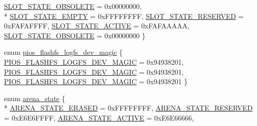 \begin{DoxyCompactItemize}
\hyperlink{group___p_i_o_s___f_l_a_s_h_f_s_gga7df58e5fca7cec32767a0481da453e74aff81f83249791cda333bde0850150ccc}{S\-L\-O\-T\-\_\-\-S\-T\-A\-T\-E\-\_\-\-O\-B\-S\-O\-L\-E\-T\-E} = 0x00000000, 
\\*
\hyperlink{group___p_i_o_s___f_l_a_s_h_f_s_gga7df58e5fca7cec32767a0481da453e74a3ec4030cfe6de3e15e9ce08f12c91734}{S\-L\-O\-T\-\_\-\-S\-T\-A\-T\-E\-\_\-\-E\-M\-P\-T\-Y} = 0x\-F\-F\-F\-F\-F\-F\-F\-F, 
\hyperlink{group___p_i_o_s___f_l_a_s_h_f_s_gga7df58e5fca7cec32767a0481da453e74acf379d22c045f40511eab34f8aafba5e}{S\-L\-O\-T\-\_\-\-S\-T\-A\-T\-E\-\_\-\-R\-E\-S\-E\-R\-V\-E\-D} = 0x\-F\-A\-F\-A\-F\-F\-F\-F, 
\hyperlink{group___p_i_o_s___f_l_a_s_h_f_s_gga7df58e5fca7cec32767a0481da453e74acf5fd7f439ede2b21808a3edc1acc4f4}{S\-L\-O\-T\-\_\-\-S\-T\-A\-T\-E\-\_\-\-A\-C\-T\-I\-V\-E} = 0x\-F\-A\-F\-A\-A\-A\-A\-A, 
\hyperlink{group___p_i_o_s___f_l_a_s_h_f_s_gga7df58e5fca7cec32767a0481da453e74aff81f83249791cda333bde0850150ccc}{S\-L\-O\-T\-\_\-\-S\-T\-A\-T\-E\-\_\-\-O\-B\-S\-O\-L\-E\-T\-E} = 0x00000000
 \}
\item 
enum \hyperlink{group___p_i_o_s___f_l_a_s_h_f_s_ga27472bb2a0fbfb6302378ef138c6a41f}{pios\-\_\-flashfs\-\_\-logfs\-\_\-dev\-\_\-magic} \{ \hyperlink{group___p_i_o_s___f_l_a_s_h_f_s_gga27472bb2a0fbfb6302378ef138c6a41fa48f1badb0700a4f00d8da2af591f701b}{P\-I\-O\-S\-\_\-\-F\-L\-A\-S\-H\-F\-S\-\_\-\-L\-O\-G\-F\-S\-\_\-\-D\-E\-V\-\_\-\-M\-A\-G\-I\-C} = 0x94938201, 
\hyperlink{group___p_i_o_s___f_l_a_s_h_f_s_gga27472bb2a0fbfb6302378ef138c6a41fa48f1badb0700a4f00d8da2af591f701b}{P\-I\-O\-S\-\_\-\-F\-L\-A\-S\-H\-F\-S\-\_\-\-L\-O\-G\-F\-S\-\_\-\-D\-E\-V\-\_\-\-M\-A\-G\-I\-C} = 0x94938201, 
\hyperlink{group___p_i_o_s___f_l_a_s_h_f_s_gga27472bb2a0fbfb6302378ef138c6a41fa48f1badb0700a4f00d8da2af591f701b}{P\-I\-O\-S\-\_\-\-F\-L\-A\-S\-H\-F\-S\-\_\-\-L\-O\-G\-F\-S\-\_\-\-D\-E\-V\-\_\-\-M\-A\-G\-I\-C} = 0x94938201
 \}
\item 
enum \hyperlink{group___p_i_o_s___f_l_a_s_h_f_s_gaa936149cfd5559190d20879c10e0fcee}{arena\-\_\-state} \{ \\*
\hyperlink{group___p_i_o_s___f_l_a_s_h_f_s_ggaa936149cfd5559190d20879c10e0fceea0868f5f69dae5f489f86f324fb2ec026}{A\-R\-E\-N\-A\-\_\-\-S\-T\-A\-T\-E\-\_\-\-E\-R\-A\-S\-E\-D} = 0x\-F\-F\-F\-F\-F\-F\-F\-F, 
\hyperlink{group___p_i_o_s___f_l_a_s_h_f_s_ggaa936149cfd5559190d20879c10e0fceeac20424e4b3a3a918490e8c307996fe7c}{A\-R\-E\-N\-A\-\_\-\-S\-T\-A\-T\-E\-\_\-\-R\-E\-S\-E\-R\-V\-E\-D} = 0x\-E6\-E6\-F\-F\-F\-F, 
\hyperlink{group___p_i_o_s___f_l_a_s_h_f_s_ggaa936149cfd5559190d20879c10e0fceea8bac821a323307ac4aa7b2de12f4896b}{A\-R\-E\-N\-A\-\_\-\-S\-T\-A\-T\-E\-\_\-\-A\-C\-T\-I\-V\-E} = 0x\-E6\-E66666, 

\end{DoxyCompactItemize}
